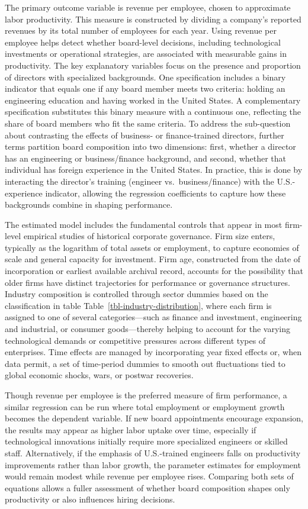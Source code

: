 \documentclass[
]{article}
\begin{document}
The primary outcome variable is revenue per employee, chosen to
approximate labor productivity. This measure is constructed by dividing
a company's reported revenues by its total number of employees for each
year. Using revenue per employee helps detect whether board-level
decisions, including technological investments or operational
strategies, are associated with measurable gains in productivity. The
key explanatory variables focus on the presence and proportion of
directors with specialized backgrounds. One specification includes a
binary indicator that equals one if any board member meets two criteria:
holding an engineering education and having worked in the United States.
A complementary specification substitutes this binary measure with a
continuous one, reflecting the share of board members who fit the same
criteria. To address the sub-question about contrasting the effects of
business- or finance-trained directors, further terms partition board
composition into two dimensions: first, whether a director has an
engineering or business/finance background, and second, whether that
individual has foreign experience in the United States. In practice,
this is done by interacting the director's training (engineer
vs.~business/finance) with the U.S.-experience indicator, allowing the
regression coefficients to capture how these backgrounds combine in
shaping performance.

The estimated model includes the fundamental controls that appear in
most firm-level empirical studies of historical corporate governance.
Firm size enters, typically as the logarithm of total assets or
employment, to capture economies of scale and general capacity for
investment. Firm age, constructed from the date of incorporation or
earliest available archival record, accounts for the possibility that
older firms have distinct trajectories for performance or governance
structures. Industry composition is controlled through sector dummies
based on the classification in table
Table~\ref{tbl-industry-distribution}, where each firm is assigned to
one of several categories---such as finance and investment, engineering
and industrial, or consumer goods---thereby helping to account for the
varying technological demands or competitive pressures across different
types of enterprises. Time effects are managed by incorporating year
fixed effects or, when data permit, a set of time-period dummies to
smooth out fluctuations tied to global economic shocks, wars, or postwar
recoveries.

Though revenue per employee is the preferred measure of firm
performance, a similar regression can be run where total employment or
employment growth becomes the dependent variable. If new board
appointments encourage expansion, the results may appear as higher labor
uptake over time, especially if technological innovations initially
require more specialized engineers or skilled staff. Alternatively, if
the emphasis of U.S.-trained engineers falls on productivity
improvements rather than labor growth, the parameter estimates for
employment would remain modest while revenue per employee rises.
Comparing both sets of equations allows a fuller assessment of whether
board composition shapes only productivity or also influences hiring
decisions.
\end{document}
